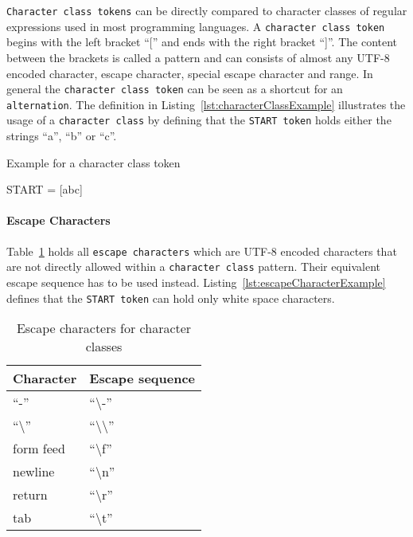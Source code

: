 \texttt{Character class tokens} can be directly compared to character classes of regular expressions used in most programming languages. A \texttt{character class token} begins with the left bracket \enquote{[} and ends with the right bracket \enquote{]}. The content between the brackets is called a pattern and can consists of almost any UTF-8 encoded character, escape character, special escape character and range. In general the \texttt{character class token} can be seen as a shortcut for an \texttt{alternation}. The definition in Listing~\ref{lst:characterClassExample} illustrates the usage of a \texttt{character class} by defining that the \texttt{START token} holds either the strings \enquote{a}, \enquote{b} or \enquote{c}.

\begin{listing}
\caption{Example for a character class token}
\label{lst:characterClassExample}
\begin{gocode}
START = [abc]
\end{gocode}
\end{listing}

\paragraph{Escape Characters}
\label{subsec:characterClassEscapeCharacters}

Table~\ref{table:escapeCharacters} holds all \texttt{escape characters} which are UTF-8 encoded characters that are not directly allowed within a \texttt{character class} pattern. Their equivalent escape sequence has to be used instead. Listing~\ref{lst:escapeCharacterExample} defines that the \texttt{START token} can hold only white space characters.

\begin{table}[H]
\caption{Escape characters for character classes}
\label{table:escapeCharacters}
\center
\begin{tabular}{| l | l |}
\hline
  \textbf{Character}
& \textbf{Escape sequence}
\tabularnewline
\hline
  \enquote{-}
& \enquote{\textbackslash-}
\tabularnewline
\hline
  \enquote{\textbackslash}
& \enquote{\textbackslash\textbackslash}
\tabularnewline
\hline
  form feed
& \enquote{\textbackslash{}f}
\tabularnewline
\hline
  newline
& \enquote{\textbackslash{}n}
\tabularnewline
\hline
  return
& \enquote{\textbackslash{}r}
\tabularnewline
\hline
  tab
& \enquote{\textbackslash{}t}
\tabularnewline
\hline
\end{tabular}
\end{table}

